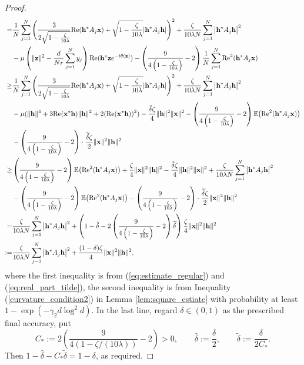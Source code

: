 \documentclass{article}
\renewcommand{\eqref}[1]{(\ref{#1})}
\newcommand{\E}{{\mathbb E}}
\newcommand{\re}{{\rm Re}}
\newcommand{\vx}{{\mathbf x}}
\newcommand{\vz}{{\mathbf z}}
\newcommand{\vh}{{\mathbf h}}
\newcommand{\0}{{\mathbf 0}}
\numberwithin{equation}{section}
\begin{document}
\begin{proof}
\begin{align*}
			=&\frac{1}{N}\sum_{j=1}^{N}\Bigg( \frac{3}{2\sqrt{1-\frac{\zeta}{10\lambda}}}\re(\vh^*A_j\vx)+\sqrt{1-\frac{\zeta}{10\lambda}}|\vh^*A_j\vh|\Bigg)^2+\frac{\zeta}{10\lambda N}\sum_{j=1}^{N}\big|\vh^*A_j\vh\big|^2\\
			&-\mu\left(\|\vz\|^2-\frac{d}{Nr}\sum^N_{j=1}y_j\right)\re(\vh^*\vz e^{-i\theta(\vz)})-\left(\frac{9}{4\left(1-\frac{\zeta}{10\lambda}\right)}-2\right) \frac{1}{N}\sum_{j=1}^{N}\re^2(\vh^*A_j\vx)\\
			\ge&\frac{1}{N}\sum_{j=1}^{N}\Bigg( \frac{3}{2\sqrt{1-\frac{\zeta}{10\lambda}}}\re(\vh^*A_j\vx)+\sqrt{1-\frac{\zeta}{10\lambda}}|\vh^*A_j\vh|\Bigg)^2+\frac{\zeta}{10\lambda N}\sum_{j=1}^{N}\big|\vh^*A_j\vh\big|^2\\
			&-\mu(\|\vh\|^4+3\re(\vx^*\vh)\|\vh\|^2+2(\re(\vx^*\vh))^2)-\frac{\hat\delta\zeta}{4}\|\vh\|^2\|\vx\|^2-\left(\frac{9}{4\left(1-\frac{\zeta}{10\lambda}\right)}-2\right)\E\big(\re^2(\vh^*A_j\vx)\big)\\
			&-\left(\frac{9}{4\left(1-\frac{\zeta}{10\lambda}\right)}-2\right)\cdot\frac{\widetilde\delta\zeta}{2}\|\vx\|^2\|\vh\|^2\\
			\ge&\left(\frac{9}{4\left(1-\frac{\zeta}{10\lambda}\right)}-2\right)\E\big(\re^2(\vh^*A_j\vx)\big)+\frac{\zeta}{4}\|\vx\|^2\|\vh\|^2-\frac{\hat\delta\zeta}{4}\|\vh\|^2\|\vx\|^2+\frac{\zeta}{10\lambda N}\sum_{j=1}^{N}\big|\vh^*A_j\vh\big|^2\\
			&-\left(\frac{9}{4\left(1-\frac{\zeta}{10\lambda}\right)}-2\right)\E\big(\re^2(\vh^*A_j\vx)\big)-\left(\frac{9}{4\left(1-\frac{\zeta}{10\lambda}\right)}-2\right)\cdot\frac{\widetilde\delta\zeta}{2}\|\vx\|^2\|\vh\|^2\\=&\frac{\zeta}{10\lambda N}\sum_{j=1}^{N}\big|\vh^*A_j\vh\big|^2+\left(1-\hat\delta-2\left(\frac{9}{4\left(1-\frac{\zeta}{10\lambda}\right)}-2\right)\widetilde\delta\right)\frac{\zeta}{4}\|\vx\|^2\|\vh\|^2\\:=&\frac{\zeta}{10\lambda N}\sum_{j=1}^{N}\big|\vh^*A_j\vh\big|^2+\frac{(1-\delta)\zeta}{4}\|\vx\|^2\|\vh\|^2,  
		\end{align*} 
		where the first inequality is from \eqref{eq:estimate_regular} and \eqref{eq:real_part_tilde}, the second inequality is from Inequality \eqref{curvature_condition2} in Lemma \ref{lem:square_estiate} with probability at least $1-\exp(-\gamma_2 d\log^2d)$.
		In the last line, regard $\delta\in(0,1)$ as the prescribed final accuracy, put
		\[
		C_*:=2\left(\frac{9}{4(1-\zeta/(10\lambda))}-2\right)>0,
		\qquad \hat\delta:=\frac\delta2,
		\qquad \widetilde\delta:=\frac{\delta}{2C_*}.
		\]
		Then $1-\hat\delta-C_*\widetilde\delta=1-\delta$, as required.	
	\end{proof}
\end{document}
